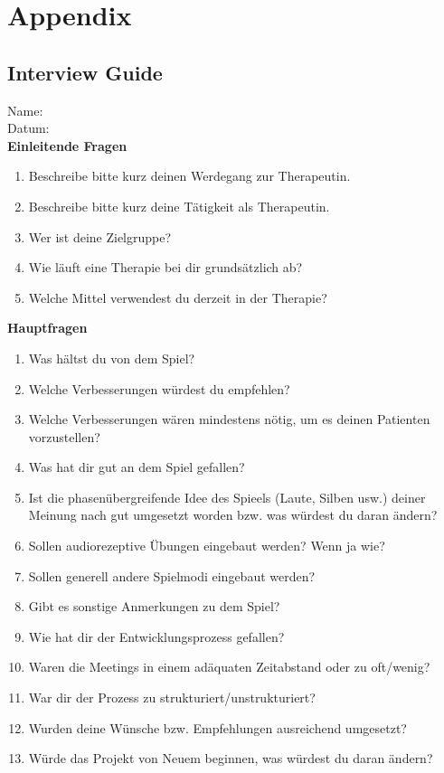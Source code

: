 \documentclass[draft,final]{vutinfth} %
\begin{document}




\chapter{Appendix}
\section{Interview Guide}
\label{sec:interview}
Name:\\
Datum: \\

\textbf{Einleitende Fragen}
\begin{enumerate}
\item Beschreibe bitte kurz deinen Werdegang zur Therapeutin.
\item Beschreibe bitte kurz deine Tätigkeit als Therapeutin.
\item Wer ist deine Zielgruppe?
\item Wie läuft eine Therapie bei dir grundsätzlich ab?
\item Welche Mittel verwendest du derzeit in der Therapie?
\end{enumerate}

\textbf{Hauptfragen}
\begin{enumerate}
\item Was hältst du von dem Spiel?
\item Welche Verbesserungen würdest du empfehlen?
\item Welche Verbesserungen wären mindestens nötig, um es deinen Patienten vorzustellen?
\item Was hat dir gut an dem Spiel gefallen?
\item Ist die phasenübergreifende Idee des Spieels (Laute, Silben usw.) deiner Meinung nach gut umgesetzt worden bzw. was würdest du daran ändern?
\item Sollen audiorezeptive Übungen eingebaut werden? Wenn ja wie?
\item Sollen generell andere Spielmodi eingebaut werden?
\item Gibt es sonstige Anmerkungen zu dem Spiel?
\item Wie hat dir der Entwicklungsprozess gefallen?
\item Waren die Meetings in einem adäquaten Zeitabstand oder zu oft/wenig?
\item War dir der Prozess zu strukturiert/unstrukturiert?
\item Wurden deine Wünsche bzw. Empfehlungen ausreichend umgesetzt?
\item Würde das Projekt von Neuem beginnen, was würdest du daran ändern?
\end{enumerate}
\end{document}
